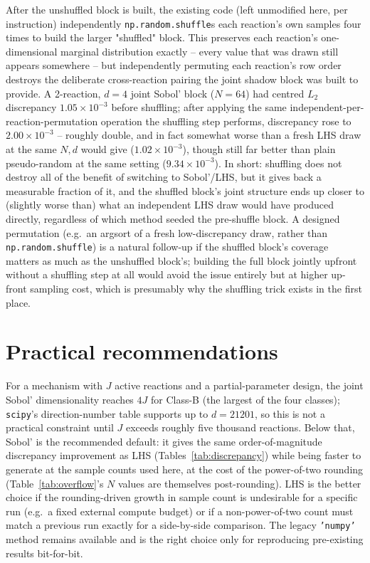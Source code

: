 \documentclass[11pt]{article}
\newcommand{\code}[1]{\texttt{#1}}
\begin{document}
After the unshuffled block is built, the existing code (left unmodified here, per instruction) independently \code{np.random.shuffle}s each reaction's own samples four times to build the larger "shuffled" block. This preserves each reaction's one-dimensional marginal distribution exactly -- every value that was drawn still appears somewhere -- but independently permuting each reaction's row order destroys the deliberate cross-reaction pairing the joint shadow block was built to provide. A 2-reaction, $d=4$ joint Sobol' block ($N=64$) had centred $L_2$ discrepancy $1.05\times10^{-3}$ before shuffling; after applying the same independent-per-reaction-permutation operation the shuffling step performs, discrepancy rose to $2.00\times10^{-3}$ -- roughly double, and in fact somewhat worse than a fresh LHS draw at the same $N,d$ would give ($1.02\times10^{-3}$), though still far better than plain pseudo-random at the same setting ($9.34\times10^{-3}$). In short: shuffling does not destroy all of the benefit of switching to Sobol'/LHS, but it gives back a measurable fraction of it, and the shuffled block's joint structure ends up closer to (slightly worse than) what an independent LHS draw would have produced directly, regardless of which method seeded the pre-shuffle block. A designed permutation (e.g.\ an argsort of a fresh low-discrepancy draw, rather than \code{np.random.shuffle}) is a natural follow-up if the shuffled block's coverage matters as much as the unshuffled block's; building the full block jointly upfront without a shuffling step at all would avoid the issue entirely but at higher up-front sampling cost, which is presumably why the shuffling trick exists in the first place.

\section{Practical recommendations}

For a mechanism with $J$ active reactions and a partial-parameter design, the joint Sobol' dimensionality reaches $4J$ for Class-B (the largest of the four classes); \code{scipy}'s direction-number table supports up to $d=21201$, so this is not a practical constraint until $J$ exceeds roughly five thousand reactions. Below that, Sobol' is the recommended default: it gives the same order-of-magnitude discrepancy improvement as LHS (Tables~\ref{tab:discrepancy}) while being faster to generate at the sample counts used here, at the cost of the power-of-two rounding (Table~\ref{tab:overflow}'s $N$ values are themselves post-rounding). LHS is the better choice if the rounding-driven growth in sample count is undesirable for a specific run (e.g.\ a fixed external compute budget) or if a non-power-of-two count must match a previous run exactly for a side-by-side comparison. The legacy \code{'numpy'} method remains available and is the right choice only for reproducing pre-existing results bit-for-bit.
\end{document}
